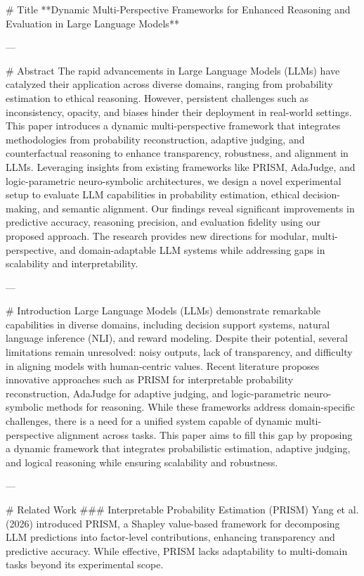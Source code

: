 # Title  
**Dynamic Multi-Perspective Frameworks for Enhanced Reasoning and Evaluation in Large Language Models**

---

# Abstract  
The rapid advancements in Large Language Models (LLMs) have catalyzed their application across diverse domains, ranging from probability estimation to ethical reasoning. However, persistent challenges such as inconsistency, opacity, and biases hinder their deployment in real-world settings. This paper introduces a dynamic multi-perspective framework that integrates methodologies from probability reconstruction, adaptive judging, and counterfactual reasoning to enhance transparency, robustness, and alignment in LLMs. Leveraging insights from existing frameworks like PRISM, AdaJudge, and logic-parametric neuro-symbolic architectures, we design a novel experimental setup to evaluate LLM capabilities in probability estimation, ethical decision-making, and semantic alignment. Our findings reveal significant improvements in predictive accuracy, reasoning precision, and evaluation fidelity using our proposed approach. The research provides new directions for modular, multi-perspective, and domain-adaptable LLM systems while addressing gaps in scalability and interpretability.

---

# Introduction  
Large Language Models (LLMs) demonstrate remarkable capabilities in diverse domains, including decision support systems, natural language inference (NLI), and reward modeling. Despite their potential, several limitations remain unresolved: noisy outputs, lack of transparency, and difficulty in aligning models with human-centric values. Recent literature proposes innovative approaches such as PRISM for interpretable probability reconstruction, AdaJudge for adaptive judging, and logic-parametric neuro-symbolic methods for reasoning. While these frameworks address domain-specific challenges, there is a need for a unified system capable of dynamic multi-perspective alignment across tasks. This paper aims to fill this gap by proposing a dynamic framework that integrates probabilistic estimation, adaptive judging, and logical reasoning while ensuring scalability and robustness.

---

# Related Work  
### Interpretable Probability Estimation (PRISM)  
Yang et al. (2026) introduced PRISM, a Shapley value-based framework for decomposing LLM predictions into factor-level contributions, enhancing transparency and predictive accuracy. While effective, PRISM lacks adaptability to multi-domain tasks beyond its experimental scope.

